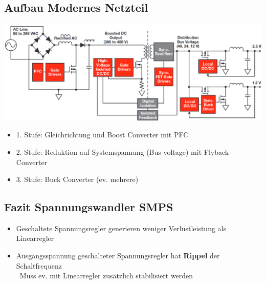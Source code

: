 \subsection{Aufbau Modernes Netzteil}

\includegraphics[width=\columnwidth]{images/modernes_netzteil.png}

\begin{itemize}
    \item 1. Stufe: Gleichrichtung und Boost Converter mit PFC
    \item 2. Stufe: Reduktion auf Systemspannung (Bus voltage) mit Flyback-Converter
    \item 3. Stufe: Buck Converter (ev. mehrere)
\end{itemize}


\subsection{Fazit Spannungswandler SMPS}

\begin{itemize}
    \item Geschaltete Spannungsregler generieren weniger Verlustleistung als Linearregler
    \item Ausgangsspannung geschalteter Spannungsregler hat \textbf{Rippel} der Schaltfrequenz \\
        \textrightarrow\ Muss ev. mit Linearregler zusätzlich stabilisiert werden
\end{itemize}

